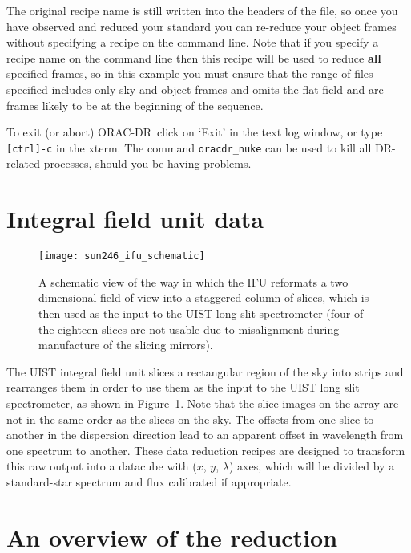 \documentclass[twoside,11pt,nolof]{starlink}
\providecommand{\ORACDR}{{\footnotesize ORAC-DR}}
\begin{document}
The original recipe name is still written into the headers of the
file, so once you have observed and reduced your standard you can
re-reduce your object frames without specifying a recipe on the
command line. Note that if you specify a recipe name on the command
line then this recipe will be used to reduce \textbf{all} specified
frames, so in this example you must ensure that the range of files
specified includes only sky and object frames and omits the flat-field
and arc frames likely to be at the beginning of the sequence.



To exit (or abort) \ORACDR\ click on `Exit' in the text log window, or
type \texttt{[ctrl]-c} in the xterm. The command \texttt{oracdr\_nuke} can
be used to kill all DR-related processes, should you be having
problems.


\section{Integral field unit data}

\begin{figure}
  \begin{center}
    \texttt{[image: sun246\_ifu\_schematic]}
    \caption{A schematic view of the way in which the IFU reformats a
      two dimensional field of view into a staggered column of slices,
      which is then used as the input to the UIST long-slit
      spectrometer (four of the eighteen slices are not usable due to
      misalignment during manufacture of the slicing mirrors).}
    \label{ifu_schematic}
  \end{center}
  \end{figure}

  The UIST integral field unit slices a rectangular region of the sky
  into strips and rearranges them in order to use them as the input to
  the UIST long slit spectrometer, as shown in
  Figure~\ref{ifu_schematic}. Note that the slice images on the array
  are not in the same order as the slices on the sky. The offsets from
  one slice to another in the dispersion direction lead to an apparent
  offset in wavelength from one spectrum to another. These data
  reduction recipes are designed to transform this raw output into a
  datacube with ($x$, $y$, $\lambda$) axes, which will be
  divided by a standard-star spectrum and flux calibrated if
  appropriate.


\section{An overview of the reduction}
\end{document}
